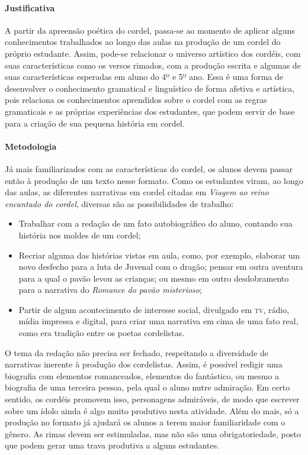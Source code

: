 \documentclass[11pt]{extarticle}
\begin{document}
\paragraph{Justificativa} A partir da apreensão poética do cordel, passa-se ao momento de aplicar alguns conhecimentos trabalhados ao longo das aulas na produção de um cordel do próprio estudante. Assim, pode-se relacionar o universo artístico dos cordéis, com suas características como os versos rimados, com a produção escrita e algumas de suas características esperadas em aluno do 4º e 5º ano. Essa é uma forma de desenvolver o conhecimento gramatical e linguístico de forma afetiva e artística, pois relaciona os conhecimentos aprendidos sobre o cordel com as regras gramaticais e as próprias experiências dos estudantes, que podem servir de base para a criação de sua pequena história em cordel.


\paragraph{Metodologia} Já mais familiarizados com as características do cordel, os alunos devem passar então à produção de um texto nesse formato. Como os estudantes viram, ao longo das aulas, as diferentes narrativas em cordel citadas em \textit{Viagem ao reino encantado do cordel}, diversas são as possibilidades de trabalho:

\begin{itemize}
\item Trabalhar com a redação de um fato autobiográfico do aluno, contando sua história nos moldes de um cordel;

\item Recriar alguma das histórias vistas em aula, como, por exemplo, elaborar um novo desfecho para a luta de Juvenal com o dragão; pensar em outra aventura para a qual o pavão levou as crianças; ou mesmo em outro desdobramento para a narrativa do \textit{Romance do pavão misterioso};

\item Partir de algum acontecimento de interesse social, divulgado em \textsc{tv}, rádio, mídia impressa e digital, para criar uma narrativa em cima de uma fato real, como era tradição entre os poetas cordelistas.
\end{itemize}

O tema da redação não precisa ser fechado, respeitando a diversidade de narrativas inerente à produção dos cordelistas. Assim, é possível redigir uma biografia com elementos romanceados, elementos do fantástico, ou mesmo a biografia de uma terceira pessoa, pela qual o aluno nutre admiração. Em certo sentido, os cordéis promovem isso,
personagens admiráveis, de modo que escrever sobre um ídolo ainda é algo
muito produtivo nesta atividade. Além do mais, só a produção no formato
já ajudará os alunos a terem maior familiaridade com o gênero. As rimas
devem ser estimuladas, mas não são uma obrigatoriedade, posto que podem
gerar uma trava produtiva a alguns estudantes.
\end{document}
